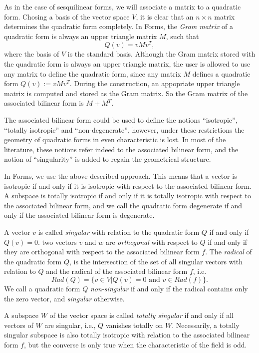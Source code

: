 \documentclass[a4paper,11pt]{report}
\begin{document}
{{ As in the case of sesquilinear forms, we will associate a matrix to a
quadratic form. Chosing a basis of the vector space $V$, it is clear that an $n \times n$ matrix determines the quadratic form completely. In \textsf{Forms}, the \emph{Gram matrix} of a quadratic form is always an upper triangle matrix $M$, such that 
\[Q(v) = vMv^T,\]
 where the basis of $V$ is the standard basis. Although the Gram matrix stored with the quadratic form
is always an upper triangle matrix, the user is allowed to use any matrix to
define the quadratic form, since any matrix $M$ defines a quadratic form $Q(v) := vMv^T$. During the construction, an appopriate upper triangle matrix is computed and
stored as the Gram matrix. So the Gram matrix of the associated bilinear form
is $M+M^T$. 

 The associated bilinear form could be used to define the notions
``isotropic'', ``totally isotropic'' and ``non-degenerate'', however, under
these restrictions the geometry of quadratic forms in even characteristic is
lost. In most of the literature, these notions refer indeed to the associated
bilinear form, and the notion of ``singularity'' is added to regain the
geometrical structure. 

In \textsf{Forms}, we use the above described approach. This means that a vector is isotropic
if and only if it is isotropic with respect to the associated bilinear form. A
subspace is totally isotropic if and only if it is totally isotropic with
respect to the associated bilinear form, and we call the quadratic form
degenerate if and only if the associated bilinear form is degenerate. 

 A vector $v$ is called \emph{singular} with relation to the quadratic form $Q$ if and only if $Q(v)=0$. two vectors $v$ and $w$ are \emph{orthogonal} with respect to $Q$ if and only if they are orthogonal with respect to the associated bilinear
form $f$. The \emph{radical} of the quadratic form $Q$, is the intersection of the set of all singular vectors with relation to $Q$ and the radical of the associated bilinear form $f$, i.e. 
\[Rad(Q) = \{v \in V | Q(v) = 0\,\, \mathrm{and}\,\, v \in Rad(f)\}.\]
  We call a quadratic form $Q$ \emph{non-singular} if and only if the radical contains only the zero vector, and \emph{singular} otherwise. 

 A subspace $W$ of the vector space is called \emph{totally singular} if and only if all vectors of $W$ are singular, i.e., $Q$ vanishes totally on $W$. Necessarily, a totally singular subspace is also totally isotropic with
relation to the associated bilinear form $f$, but the converse is only true when the characteristic of the field is odd. 

}}
\end{document}
